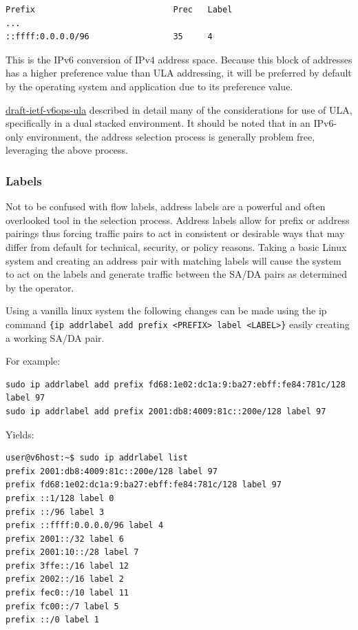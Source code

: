 \documentclass[
]{article}
\begin{document}
\begin{verbatim}
Prefix                            Prec   Label      
...
::ffff:0.0.0.0/96                 35     4
\end{verbatim}

This is the IPv6 conversion of IPv4 address space. Because this block of
addresses has a higher preference value than ULA addressing, it will be
preferred by default by the operating system and application due to its
preference value.

\href{https://datatracker.ietf.org/doc/draft-ietf-v6ops-ula/}{draft-ietf-v6ops-ula}
described in detail many of the considerations for use of ULA,
specifically in a dual stacked environment. It should be noted that in
an IPv6-only environment, the address selection process is generally
problem free, leveraging the above process.

\subsubsection{Labels}\label{labels}

Not to be confused with flow labels, address labels are a powerful and
often overlooked tool in the selection process. Address labels allow for
prefix or address pairings thus forcing traffic pairs to act in
consistent or desirable ways that may differ from default for technical,
security, or policy reasons. Taking a basic Linux system and creating an
address pair with matching labels will cause the system to act on the
labels and generate traffic between the SA/DA pairs as determined by the
operator.

Using a vanilla linux system the following changes can be made using the
ip command
\texttt{\{ip\ addrlabel\ add\ prefix\ \textless{}PREFIX\textgreater{}\ label\ \textless{}LABEL\textgreater{}\}}
easily creating a working SA/DA pair.

For example:

\begin{verbatim}
sudo ip addrlabel add prefix fd68:1e02:dc1a:9:ba27:ebff:fe84:781c/128 label 97
sudo ip addrlabel add prefix 2001:db8:4009:81c::200e/128 label 97
\end{verbatim}

Yields:

\begin{verbatim}
user@v6host:~$ sudo ip addrlabel list
prefix 2001:db8:4009:81c::200e/128 label 97
prefix fd68:1e02:dc1a:9:ba27:ebff:fe84:781c/128 label 97
prefix ::1/128 label 0
prefix ::/96 label 3
prefix ::ffff:0.0.0.0/96 label 4
prefix 2001::/32 label 6
prefix 2001:10::/28 label 7
prefix 3ffe::/16 label 12
prefix 2002::/16 label 2
prefix fec0::/10 label 11
prefix fc00::/7 label 5
prefix ::/0 label 1
\end{verbatim}
\end{document}
